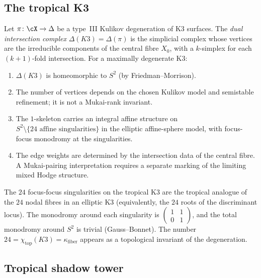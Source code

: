 \subsection{The tropical K3}
\label{subsec:tropical-k3}

\begin{definition}
\label{def:tropical-k3}
Let $\pi \colon \cX \to \Delta$ be a type~III Kulikov degeneration of K3 surfaces. The \emph{dual intersection complex} $\Delta(K3) = \Delta(\pi)$ is the simplicial complex whose vertices are the irreducible components of the central fibre $X_0$, with a $k$-simplex for each $(k+1)$-fold intersection. For a maximally degenerate K3:
\begin{enumerate}[label=\textup{(\roman*)}]
\item $\Delta(K3)$ is homeomorphic to $S^2$ (by Friedman--Morrison).
\item The number of vertices depends on the chosen Kulikov model and
semistable refinement; it is not a Mukai-rank invariant.
\item The $1$-skeleton carries an integral affine structure on
\(S^2\setminus\{24\text{ affine singularities}\}\) in the elliptic
affine-sphere model, with focus-focus monodromy at the singularities.
\item The edge weights are determined by the intersection data of the
central fibre.  A Mukai-pairing interpretation requires a separate
marking of the limiting mixed Hodge structure.
\end{enumerate}
\end{definition}

\begin{remark}
\label{rem:tropical-k3-24}
The $24$ focus-focus singularities on the tropical K3 are the tropical analogue of the $24$ nodal fibres in an elliptic K3 (equivalently, the $24$ roots of the discriminant locus). The monodromy around each singularity is $\left(\begin{smallmatrix} 1 & 1 \\ 0 & 1 \end{smallmatrix}\right)$, and the total monodromy around $S^2$ is trivial (Gauss--Bonnet). The number $24 = \chi_{\mathrm{top}}(K3) = \kappa_{\mathrm{fiber}}$ appears as a topological invariant of the degeneration.
\end{remark}

\subsection{Tropical shadow tower}
\label{subsec:tropical-shadow}

